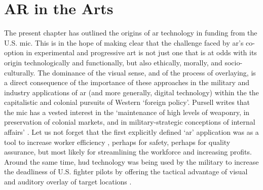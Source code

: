 \section{AR in the Arts}\label{sec: ar-arts}
The present chapter has outlined the origins of \gls{ar} technology in funding from the U.S. \gls{mic}. This is in the hope of making clear that the challenge faced by \gls{ar}'s co-option in experimental and progressive art is not just one that is at odds with its origin technologically and functionally, but also ethically, morally, and socio-culturally. The dominance of the visual sense, and of the process of overlaying, is a direct consequence of the importance of these approaches in the military and industry applications of \gls{ar} (and more generally, digital technology) within the the capitalistic and colonial pursuits of Western `foreign policy'. Pursell writes that the \gls{mic} has a vested interest in the `maintenance of high levels of weaponry, in preservation of colonial markets, and in military-strategic conceptions of internal affairs' \citeyearpar{pursell1972}. Let us not forget that the first explicitly defined `\gls{ar}' application was as a tool to increase worker efficiency \citep{caudell1992}, perhaps for safety, perhaps for quality assurance, but most likely for streamlining the workforce and increasing profits. Around the same time, \gls{hud} technology was being used by the military to increase the deadliness of U.S. fighter pilots by offering the tactical advantage of visual and auditory overlay of target locations \citep{wanstall1989}. 

